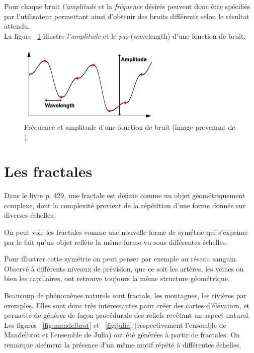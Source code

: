  Pour chaque bruit \emph{l'amplitude} et la \emph{fréquence} désirés
peuvent donc être spécifiés par l'utilisateur permettant ainsi d'obtenir des
bruits différents selon le résultat attendu.\\

La figure ~\ref{fig:noise-freq-ampl} illustre \emph{l'amplitude} et le \emph{pas}
(wavelength) d'une fonction de bruit.\\

\begin{figure}[ht]
  \centering
  \includegraphics{resources/noise-freq-ampl.png}
  \caption{Fréquence et amplitude d'une fonction de bruit (image provenant de
    \cite{PerlinWeb}).}
  \label{fig:noise-freq-ampl}
\end{figure}


\section{Les fractales}
Dans le livre \cite{Eber02} p. 429, une fractale est définie comme un objet
géométriquement complexe, dont la complexité provient de la répétition
d'une forme donnée sur diverses échelles.

On peut voir les fractales comme une nouvelle forme de symétrie qui
s'exprime par le fait qu'un objet reflète la même forme vu sous
différentes échelles.

Pour illustrer cette symétrie on peut penser par exemple au réseau sanguin.
Observé à différents niveaux de prévision, que ce soit les artères, les veines
ou bien les capillaires, ont retrouve toujours la même structure géométrique.

Beaucoup de phénomènes naturels sont fractals, les montagnes, les rivières par
exemples. Elles sont donc très intéressantes pour créer des cartes d'élévation,
et permette de générer de façon procédurale des reliefs revêtant un aspect
naturel.\\

Les figures ~\ref{fig:mandelbrot} et ~\ref{fig:julia} (respectivement l'ensemble de Mandelbrot et l'ensemble de Julia)
ont été générées à partir de fractales. On remarque aisément la présence d'un
même motif répété à différentes échelles.\\

